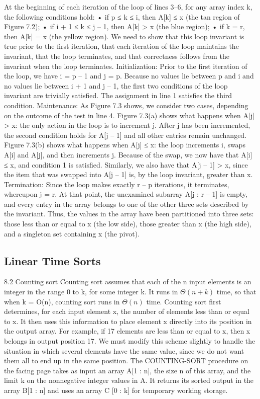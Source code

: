 At the beginning of each iteration of the loop of lines 3–6, for any array index k, the following conditions hold:
• if p ≤ k ≤ i, then A[k] ≤ x (the tan region of Figure 7.2);
• if i + 1 ≤ k ≤ j – 1, then A[k] > x (the blue region);
• if k = r, then A[k] = x (the yellow region).
We need to show that this loop invariant is true prior to the first iteration, that each iteration of the loop maintains the invariant, that the loop terminates, and that correctness follows from the invariant when the loop terminates.
Initialization: Prior to the first iteration of the loop, we have i = p – 1 and j = p. Because no values lie between p and i and no values lie between i + 1 and j – 1, the first two conditions of the loop invariant are trivially satisfied. The assignment in line 1 satisfies the third condition.
Maintenance: As Figure 7.3 shows, we consider two cases, depending on the outcome of the test in line 4. Figure 7.3(a) shows what happens when A[j] > x: the only action in the loop is to increment j. After j has been incremented, the second condition holds for A[j – 1] and all other entries remain unchanged. Figure 7.3(b) shows what happens when A[j] ≤ x: the loop increments i, swaps A[i] and A[j], and then increments j. Because of the swap, we now have that A[i] ≤ x, and condition 1 is satisfied. Similarly, we also have that A[j – 1] > x, since the item that was swapped into A[j – 1] is, by the loop invariant, greater than x.
Termination: Since the loop makes exactly r – p iterations, it terminates, whereupon j = r. At that point, the unexamined subarray A[j : r – 1] is empty, and every entry in the array belongs to one of the other three sets described by the invariant. Thus, the values in the array have been partitioned into three sets: those less than or equal to x (the low side), those greater than x (the high side), and a singleton set containing x (the pivot).


\subsection{Linear Time Sorts}
8.2 Counting sort
Counting sort assumes that each of the n input elements is an integer in the range 0 to k, for some integer k. It runs in $\Theta \left(n + k\right)$ time, so that when k = O(n), counting sort runs in $\Theta\left(n\right)$ time.
Counting sort first determines, for each input element x, the number of elements less than or equal to x. It then uses this information to place element x directly into its position in the output array. For example, if 17 elements are less than or equal to x, then x belongs in output position 17. We must modify this scheme slightly to handle the situation in which several elements have the same value, since we do not want them all to end up in the same position.
The COUNTING-SORT procedure on the facing page takes as input an array A[1 : n], the size n of this array, and the limit k on the nonnegative integer values in A. It returns its sorted output in the array B[1 : n] and uses an array C [0 : k] for temporary working storage.


